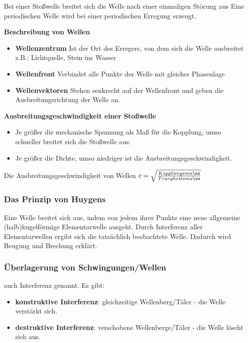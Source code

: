 \documentclass[../document.tex]{subfiles}
\begin{document}
Bei einer Stoßwelle breitet sich die Welle nach einer einmaligen Störung aus
Eine periodischen Welle wird bei einer periodischen Erregung erzeugt.

\textbf{Beschreibung von Wellen}
\begin{itemize}
	\item \textbf{Wellenzentrum} Ist der Ort des Erregers, von dem sich die Welle ausbreitet\\z.B.: Lichtquelle, Stein ins Wasser
	\item \textbf{Wellenfront} Verbindet alle Punkte der Welle mit gleicher Phasenlage
	\item \textbf{Wellenvektoren} Stehen senkrecht auf der Wellenfront und geben die Ausbreitungsrichtung der Welle an.
\end{itemize}

\textbf{Ausbreitungsgeschwindigkeit einer Stoßwelle}
\begin{itemize}
	\item Je größer die mechanische Spannung als Maß für die Kopplung, umso schneller breitet sich die Stoßwelle aus.
	\item Je größer die Dichte, umso niedriger ist die Ausbreitungsgeschwindigkeit.
\end{itemize}

Die Ausbreitungsgeschwindigkeit von Wellen $c = \sqrt{\frac{Kopplungsma\ss}{Traegheitsma\ss}}$

\subsubsection{Das Prinzip von Huygens}

Eine Welle breitet sich aus, indem von jedem ihrer Punkte eine neue allgemeine (halb)kugelförmige Elementarwelle ausgeht. Durch Interferenz aller Elementarwellen ergibt sich die tatsächlich beobachtete Welle. Dadurch wird Beugung und Brechung erklärt.

\subsubsection{Überlagerung von Schwingungen/Wellen}
auch Interferenz genannt. Es gibt:
\begin{itemize}
	\item \textbf{konstruktive Interferenz}: gleichzeitige Wellenberg/Täler - die Welle verstärkt sich.
	\item \textbf{destruktive Interferenz}: verschobene Wellenberge/Täler - die Welle löscht sich aus.
\end{itemize}
\end{document}
